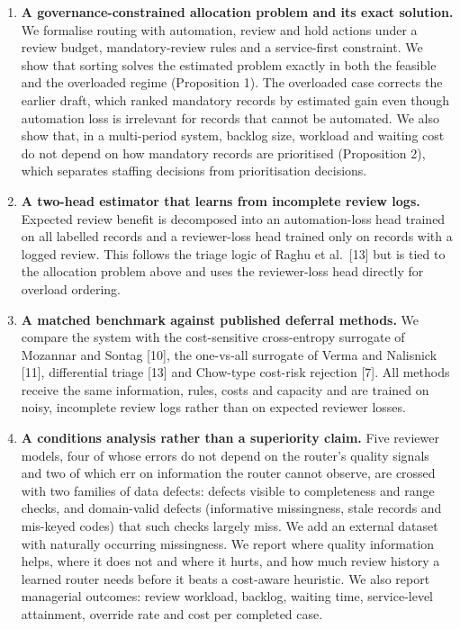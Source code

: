 \documentclass[
  11pt,
]{article}
\providecommand{\tightlist}{%
  \setlength{\itemsep}{0pt}\setlength{\parskip}{0pt}}
\begin{document}
\begin{enumerate}
\def\labelenumi{\arabic{enumi}.}
\tightlist
\item
  \textbf{A governance-constrained allocation problem and its exact
  solution.} We formalise routing with automation, review and hold
  actions under a review budget, mandatory-review rules and a
  service-first constraint. We show that sorting solves the estimated
  problem exactly in both the feasible and the overloaded regime
  (Proposition 1). The overloaded case corrects the earlier draft, which
  ranked mandatory records by estimated gain even though automation loss
  is irrelevant for records that cannot be automated. We also show that,
  in a multi-period system, backlog size, workload and waiting cost do
  not depend on how mandatory records are prioritised (Proposition 2),
  which separates staffing decisions from prioritisation decisions.
\item
  \textbf{A two-head estimator that learns from incomplete review logs.}
  Expected review benefit is decomposed into an automation-loss head
  trained on all labelled records and a reviewer-loss head trained only
  on records with a logged review. This follows the triage logic of
  Raghu et al.~{[}13{]} but is tied to the allocation problem above and
  uses the reviewer-loss head directly for overload ordering.
\item
  \textbf{A matched benchmark against published deferral methods.} We
  compare the system with the cost-sensitive cross-entropy surrogate of
  Mozannar and Sontag {[}10{]}, the one-vs-all surrogate of Verma and
  Nalisnick {[}11{]}, differential triage {[}13{]} and Chow-type
  cost-risk rejection {[}7{]}. All methods receive the same information,
  rules, costs and capacity and are trained on noisy, incomplete review
  logs rather than on expected reviewer losses.
\item
  \textbf{A conditions analysis rather than a superiority claim.} Five
  reviewer models, four of whose errors do not depend on the router's
  quality signals and two of which err on information the router cannot
  observe, are crossed with two families of data defects: defects
  visible to completeness and range checks, and domain-valid defects
  (informative missingness, stale records and mis-keyed codes) that such
  checks largely miss. We add an external dataset with naturally
  occurring missingness. We report where quality information helps,
  where it does not and where it hurts, and how much review history a
  learned router needs before it beats a cost-aware heuristic. We also
  report managerial outcomes: review workload, backlog, waiting time,
  service-level attainment, override rate and cost per completed case.
\end{enumerate}
\end{document}
